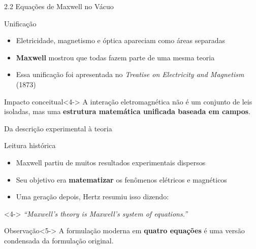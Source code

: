 \documentclass[aspectratio=169]{beamer}
\begin{document}
\begin{frame}{2.2 Equações de Maxwell no Vácuo}

\begin{block}{Unificação}
\begin{itemize}
\item<1-> Eletricidade, magnetismo e óptica apareciam como áreas separadas
\item<2-> \textbf{Maxwell} mostrou que todas fazem parte de uma mesma teoria
\item<3-> Essa unificação foi apresentada no \emph{Treatise on Electricity and Magnetism} (1873)
\end{itemize}
\end{block}

\begin{alertblock}{Impacto conceitual}<4->
A interação eletromagnética não é um conjunto de leis isoladas, mas uma
\textbf{estrutura matemática unificada baseada em campos}.
\end{alertblock}

\end{frame}

\begin{frame}{Da descrição experimental à teoria}

\begin{block}{Leitura histórica}
\begin{itemize}
\item<1-> Maxwell partiu de muitos resultados experimentais dispersos
\item<2-> Seu objetivo era \textbf{matematizar} os fenômenos elétricos e magnéticos
\item<3-> Uma geração depois, Hertz resumiu isso dizendo:
\end{itemize}
\end{block}

\begin{alertblock}<4->
\centering
\emph{“Maxwell’s theory is Maxwell’s system of equations.”}
\end{alertblock}

\begin{block}{Observação}<5->
A formulação moderna em \textbf{quatro equações} é uma versão condensada da formulação original.
\end{block}

\end{frame}
\end{document}

